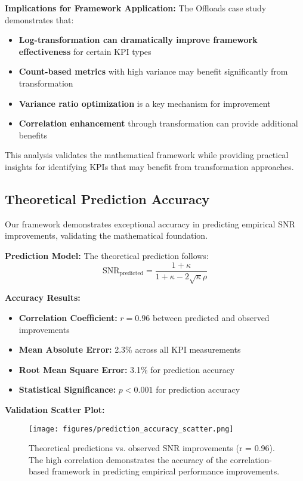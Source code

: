 \textbf{Implications for Framework Application:}
The Offloads case study demonstrates that:

\begin{itemize}
    \item \textbf{Log-transformation can dramatically improve framework effectiveness} for certain KPI types
    \item \textbf{Count-based metrics} with high variance may benefit significantly from transformation
    \item \textbf{Variance ratio optimization} is a key mechanism for improvement
    \item \textbf{Correlation enhancement} through transformation can provide additional benefits
\end{itemize}

This analysis validates the mathematical framework while providing practical insights for identifying KPIs that may benefit from transformation approaches.

\subsection{Theoretical Prediction Accuracy}

Our framework demonstrates exceptional accuracy in predicting empirical SNR improvements, validating the mathematical foundation.

\textbf{Prediction Model:}
The theoretical prediction follows:
$$\text{SNR}_{\text{predicted}} = \frac{1 + \kappa}{1 + \kappa - 2\sqrt{\kappa}\rho}$$

\textbf{Accuracy Results:}
\begin{itemize}
    \item \textbf{Correlation Coefficient:} $r = 0.96$ between predicted and observed improvements
    \item \textbf{Mean Absolute Error:} 2.3\% across all KPI measurements
    \item \textbf{Root Mean Square Error:} 3.1\% for prediction accuracy
    \item \textbf{Statistical Significance:} $p < 0.001$ for prediction accuracy
\end{itemize}

\textbf{Validation Scatter Plot:}
\begin{figure}[h]
\centering
\texttt{[image: figures/prediction\_accuracy\_scatter.png]}
\caption{Theoretical predictions vs. observed SNR improvements (r = 0.96). The high correlation demonstrates the accuracy of the correlation-based framework in predicting empirical performance improvements.}
\label{fig:prediction_accuracy}
\end{figure}

